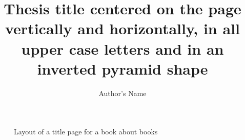 \documentclass{memoir}
\title{Thesis title centered on the page vertically and horizontally, in all upper case letters and in an inverted pyramid shape}         %
\author{Author's Name}  %
\begin{document}

\begin{figure}
	\centering
	\begin{showtitle}
		\titleGM
	\end{showtitle}
	\caption{Layout of a title page for a book about books}\label{figure:titleGM}
\end{figure}
\begin{figure} \begin{showtitle} \titleJT \end{showtitle} \end{figure}
\begin{figure} \begin{showtitle} \titleTH \end{showtitle} \end{figure}
\begin{figure} \begin{showtitle} \titleM \end{showtitle} \end{figure}
\begin{figure} \begin{showtitle} \titleS \end{showtitle} \end{figure}
\begin{figure} \begin{showtitle} \titleRF \end{showtitle} \end{figure}
\begin{figure} \begin{showtitle} \titleDB \end{showtitle} \end{figure}
\begin{figure} \begin{showtitle} \titleAM \end{showtitle} \end{figure}
\begin{figure} \begin{showtitle} \titleP \end{showtitle} \end{figure}
\begin{figure} \begin{showtitle} \titleHL \end{showtitle} \end{figure}
\begin{figure} \begin{showtitle} \titleVL \end{showtitle} \end{figure}
\end{document}
